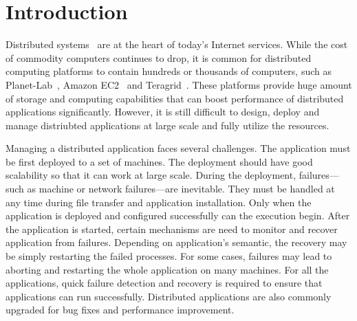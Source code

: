 \section{Introduction}


Distributed systems~\cite{Ghemawat2003, DeCandia2007} are at
the heart of today's Internet services. While the cost of
commodity computers continues to drop, it is common for
distributed computing platforms to contain hundreds or
thousands of computers, such as
Planet-Lab~\cite{Bavier2004}, Amazon
EC2~\cite{Garfinkel2007} and Teragrid~\cite{Catlett2002}.
These platforms provide huge amount of storage and computing
capabilities that can boost performance of distributed
applications significantly. However, it is still difficult
to design, deploy and manage distriubted applications at
large scale and fully utilize the resources.


Managing a distributed application faces several challenges.
The application must be first deployed to a set of machines.
The deployment should have good scalability so that it can
work at large scale. During the deployment,
failures---such as machine or network failures---are
inevitable. They must be handled at any time during file
transfer and application installation. Only when the
application is deployed and configured successfully can the
execution begin. After the application is started, certain
mechanisms are need to monitor and recover application from
failures.  Depending on application's semantic, the recovery
may be simply restarting the failed processes. For some
cases, failures may lead to aborting and restarting the
whole application on many machines. For all the
applications, quick failure detection and recovery is
required to ensure that applications can run
successfully. Distributed applications are also commonly
upgraded for bug fixes and performance improvement.

